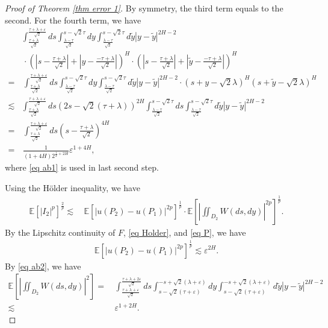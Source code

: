 \documentclass[11pt,reqno]{amsart}
\numberwithin{equation}{section}
\newcommand{\1}{{\bf 1}}
\newcommand{\2}{{\bf 2}}
\begin{document}
\begin{proof}[Proof of Theorem \ref{thm error 1}]
 By symmetry, the third term equals to the second.   
  For the fourth term, we have
\begin{align*}
& \int_{\frac{\tau+\lambda}{\sqrt 2} }^ \frac{\tau+\lambda+\varepsilon}{\sqrt 2}ds    \int_{\frac{\lambda-\tau}{\sqrt 2}}^{s -\sqrt{2}\tau }    dy    \int_{\frac{\lambda-\tau}{\sqrt 2}}^{s-\sqrt{2}\tau }     d\tilde{y} |y - \tilde{y}|^{2H-2} \\
  &\, \cdot \left( \left| s - \frac{\tau+\lambda}{\sqrt{2}} \right| + \left| y - \frac{-\tau+\lambda}{\sqrt{2}} \right| \right)^{H} 
  \cdot \left( \left| s - \frac{\tau+\lambda}{\sqrt{2}} \right| + \left| \tilde y - \frac{-\tau+\lambda}{\sqrt{2}} \right| \right)^{H}\\
  =&\, \int_{\frac{\tau+\lambda}{\sqrt 2} }^ \frac{\tau+\lambda+\varepsilon}{\sqrt 2}ds   \int_{\frac{\lambda-\tau}{\sqrt 2}}^{s -\sqrt{2}\tau }    dy   \int_{\frac{\lambda-\tau}{\sqrt 2}}^{s -\sqrt{2}\tau }     d\tilde{y} |y - \tilde{y}|^{2H-2}  \cdot 
  \left(   s +y-\sqrt{2} \lambda \right)^{H}  \left(   s+\tilde y-\sqrt{2}  \lambda \right)^{H}  \\
\lesssim &  \int_{\frac{\tau+\lambda}{\sqrt 2} }^ \frac{\tau+\lambda+\varepsilon}{\sqrt 2}ds       \left (2s-\sqrt{2}(\tau+\lambda)\right)^{2H} \int_{\frac{\lambda-\tau}{\sqrt 2}}^{s -\sqrt{2}\tau }    ds    \int_{\frac{\lambda-\tau}{\sqrt 2}}^{s -\sqrt{2}\tau }     d\tilde{y} |y - \tilde{y}|^{2H-2} \\
   = &\,    \int_{\frac{\tau+\lambda}{\sqrt 2} }^ \frac{\tau+\lambda+\varepsilon}{\sqrt 2}ds \left ( s- \frac{\tau+\lambda}{\sqrt{2}}\right)^{4H}  \\
=&\, \frac{1}{(1+4H) 2^{\frac12+2H}} \varepsilon^{1+4H},
 \end{align*}
where    \eqref{eq ab1} is used  in  last  second step. 
 
   
Using the  H\"older  inequality,  we have 
\begin{equation}
\begin{split}
 \mathbb E\left[|I_2|^p\right]^{\frac{2}{p}} \lesssim &\,  \mathbb E\left[ \left| u(P_2)- u(P_1)\right|^{2p}\right]^{\frac{1}{p}}  \cdot \mathbb E\left[ \left|\iint_{D_2} W(ds,dy)\right|^{2p}\right]^{\frac1p}.
\end{split}
\end{equation} 
 By the Lipschitz continuity of $F$,  \eqref{eq Holder}, and  \eqref{eq P}, we have 
 \begin{align*}
 \mathbb E\left[ \left| u(P_2)- u(P_1)\right|^{2p}\right]^{\frac{1}{p}}  \lesssim \varepsilon^{2H}.
 \end{align*}
By   \eqref{eq ab2}, we have 
\begin{align*}
\mathbb E\left[ \left|\iint_{D_2} W(ds,dy)\right|^{2}\right]=&\,  \int_{\frac{\tau+\lambda+\varepsilon}{\sqrt 2}}^{   \frac{\tau+\lambda+2\varepsilon}{\sqrt 2}}ds\int_{
  s-\sqrt{2}(\tau+\varepsilon)}^{  -s+\sqrt 2(\lambda+ \varepsilon)}dy  \int_{   s-\sqrt{2}(\tau+\varepsilon)}^{  -s+\sqrt 2(\lambda+ \varepsilon)}d\tilde y   |y- \tilde{y}|^{2H-2}\\
   \lesssim &\,  \varepsilon^{1+2H}.
 \end{align*}


\end{proof}
\end{document}
